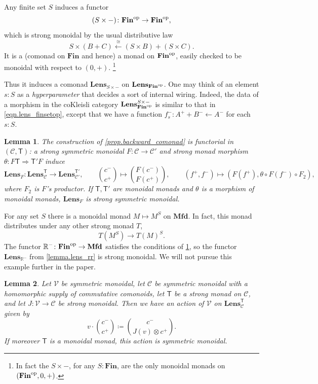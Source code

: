 \documentclass[11pt, oneside, article]{memoir}
\theoremstyle{definition}
\theoremstyle{plain}
\newtheorem{lemma}[lemma]{Lemma}
\newenvironment{example}
  {\pushQED{\qed}\renewcommand{\qedsymbol}{$\lozenge$}\examplex}
  {\popQED\endexamplex}
\newcommand{\cat}[1]{\mathcal{#1}}%
\newcommand{\Cat}[1]{\mathbf{#1}}%
\newcommand{\Fun}[1]{\mathsf{#1}}%
\newcommand{\from}{\leftarrow}
\newcommand{\From}[1]{\xleftarrow{#1}}
\newcommand{\op}{^\tn{op}}
\newcommand{\tn}[1]{\textnormal{#1}}
\newcommand{\rr}{\mathbb{R}}
\newcommand{\finset}{\Cat{Fin}}
\newcommand{\mfd}{\Cat{Mfd}}
\newcommand{\Lens}[1]{\Cat{Lens}_{#1}}
\newcommand{\inpt}[1]{#1^{-}}
\newcommand{\outp}[1]{#1^{+}}
\newcommand{\lensob}[1]{\binom{\inpt{#1}}{\outp{#1}}}%
\begin{document}
\begin{example}[Monoidal monads on $\finset\op$]\label{ex.mms_finsetop}
Any finite set $S$ induces a functor
\[(S\times -)\colon\finset\op\to\finset\op,\]
which is strong monoidal by the usual distributive law
\[
S\times(B+C)\From{\cong}(S\times B)+(S\times C).
\]
It is a (comonad on $\finset$ and hence) a monad on $\finset\op$, easily checked to be monoidal with respect to $(0,+)$.%
\footnote{In fact the $S\times-$, for any $S:\finset$, are the only monoidal monads on $(\finset\op,0,+)$.
}

Thus it induces a comonad $\Lens{S\times-}$ on $\Lens{\finset\op}$. One may think of an element $s:S$ as a \emph{hyperparameter} that decides a sort of internal wiring. Indeed, the data of a morphism in the coKleisli category $\Lens{\finset\op}^{S\times-}$ is similar to that in \cref{eqn.lens_finsetop}, except that we have a function $\inpt f_s\colon\outp A+\inpt B\from\inpt A$ for each $s:S$.
\end{example}

\begin{lemma}\label{lem.lens_T_functoriality}
The construction of \cref{prop.backward_comonad} is functorial in $(\cat{C},\Fun{T})$: a strong symmetric monoidal $F\colon\cat C\to\cat C'$ and strong monad morphism $\theta\colon F\Fun T\Rightarrow\Fun T'F$ induce
\[
\Lens F\colon\Lens{\cat C}^{\Fun T}\to\Lens{\cat C'}^{\Fun T'},\qquad
\lensob c\mapsto\binom{F(\inpt c)}{F(\outp c)},\qquad
(\outp f,\inpt f)\mapsto(F(\outp f),\theta\circ F(\inpt f)\circ F_2),
\]
where $F_2$ is $F$'s productor. If $\Fun T,\Fun T'$ are monoidal monads and $\theta$ is a morphism of monoidal monads, $\Lens F$ is strong symmetric monoidal.
\end{lemma}

\begin{example}
For any set $S$ there is a monoidal monad $M\mapsto M^S$ on $\mfd$. In fact, this monad distributes under any other strong monad $T$,
\[
T(M^S)\to T(M)^S.
\]
The functor $\rr^-\colon\finset\op\to\mfd$ satisfies the conditions of \cref{lem.lens_T_functoriality}, so the functor $\Lens{\rr^-}$ from \cref{lemma.lens_rr} is strong monoidal. We will not pursue this example further in the paper.
\end{example}

\begin{lemma}\label{lem.parameter_lens_action}
Let $\cat V$ be symmetric monoidal, let $\cat C$ be symmetric monoidal with a homomorphic supply of commutative comonoids, let $\Fun T$ be a strong monad on $\cat C$, and let $J\colon\cat V\to\cat C$ be strong monoidal. Then we have an action of $\cat V$ on $\Lens{\cat C}^{\Fun T}$ given by
\[
v\cdot\lensob c\coloneqq\binom{\inpt c}{J(v)\otimes\outp c}.
\]
If moreover $\Fun T$ is a monoidal monad, this action is symmetric monoidal.
\end{lemma}
\end{document}
